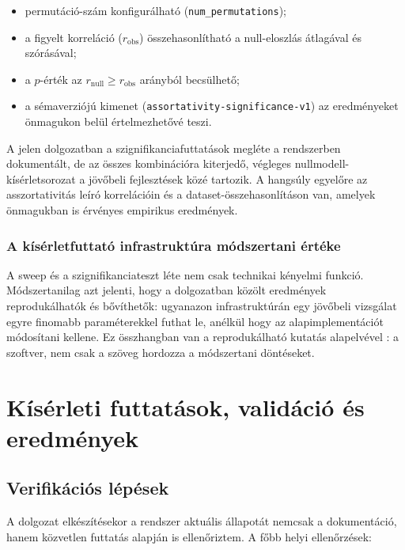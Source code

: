 ﻿\documentclass[a4paper,12pt]{report}
\begin{document}
\begin{itemize}
    \item permutáció-szám konfigurálható (\texttt{num\_permutations});
    \item a figyelt korreláció ($r_\mathrm{obs}$) összehasonlítható a null-eloszlás átlagával és szórásával;
    \item a $p$-érték az $r_\mathrm{null} \geq r_\mathrm{obs}$ arányból becsülhető;
    \item a sémaverziójú kimenet (\texttt{assortativity-significance-v1}) az eredményeket önmagukon belül értelmezhetővé teszi.
\end{itemize}

A jelen dolgozatban a szignifikanciafuttatások megléte a rendszerben dokumentált, de az összes kombinációra kiterjedő, végleges nullmodell-kísérletsorozat a jövőbeli fejlesztések közé tartozik. A hangsúly egyelőre az asszortativitás leíró korrelációin és a dataset-összehasonlításon van, amelyek önmagukban is érvényes empirikus eredmények.

\subsection{A kísérletfuttató infrastruktúra módszertani értéke}

A sweep és a szignifikanciateszt léte nem csak technikai kényelmi funkció. Módszertanilag azt jelenti, hogy a dolgozatban közölt eredmények reprodukálhatók és bővíthetők: ugyanazon infrastruktúrán egy jövőbeli vizsgálat egyre finomabb paraméterekkel futhat le, anélkül hogy az alapimplementációt módosítani kellene. Ez összhangban van a reprodukálható kutatás alapelvével \cite{sandve2013}: a szoftver, nem csak a szöveg hordozza a módszertani döntéseket.

\chapter{Kísérleti futtatások, validáció és eredmények}

\section{Verifikációs lépések}

A dolgozat elkészítésekor a rendszer aktuális állapotát nemcsak a dokumentáció, hanem közvetlen futtatás alapján is ellenőriztem. A főbb helyi ellenőrzések:
\end{document}
